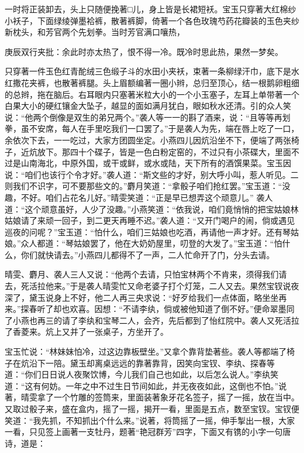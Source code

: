 \begin{parag}
    一时将正装卸去，头上只随便挽著□儿，身上皆是长裙短袄。宝玉只穿著大红棉纱小袄子，下面绿绫弹墨袷裤，散著裤脚，倚著一个各色玫瑰芍药花瓣装的玉色夹纱新枕头，和芳官两个先划拳。当时芳官满口嚷热，\begin{note}庚辰双行夹批：余此时亦太热了，恨不得一冷。既冷时思此热，果然一梦矣。\end{note}只穿著一件玉色红青酡绒三色缎子斗的水田小夹袄，束著一条柳绿汗巾，底下是水红撒花夹裤，也散著裤腿。头上眉额编著一圈小辫，总归至顶心，结一根鹅卵粗细的总辫，拖在脑后。右耳眼内只塞著米粒大小的一个小玉塞子，左耳上单带著一个白果大小的硬红镶金大坠子，越显的面如满月犹白，眼如秋水还清。引的众人笑说：“他两个倒像是双生的弟兄两个。”袭人等一一的斟了酒来，说：“且等等再划拳，虽不安席，每人在手里吃我们一口罢了。”于是袭人为先，端在唇上吃了一口，余依次下去，一一吃过，大家方团圆坐定。小燕四儿因炕沿坐不下，便端了两张椅子，近炕放下。那四十个碟子，皆是一色白粉定窑的，不过只有小茶碟大，里面不过是山南海北，中原外国，或干或鲜，或水或陆，天下所有的酒馔果菜。宝玉因说：“咱们也该行个令才好。”袭人道：“斯文些的才好，别大呼小叫，惹人听见。二则我们不识字，可不要那些文的。”麝月笑道：“拿骰子咱们抢红罢。”宝玉道：“没趣，不好。咱们占花名儿好。”晴雯笑道：“正是早已想弄这个顽意儿。” 袭人道：“这个顽意虽好，人少了没趣。”小燕笑道：“依我说，咱们竟悄悄的把宝姑娘林姑娘请了来顽一回子，到二更天再睡不迟。”袭人道：“又开门喝户的闹，倘或遇见巡夜的问呢？”宝玉道：“怕什么，咱们三姑娘也吃酒，再请他一声才好。还有琴姑娘。”众人都道：“琴姑娘罢了，他在大奶奶屋里，叨登的大发了。”宝玉道：“怕什么，你们就快请去。”小燕四儿都得不了一声，二人忙命开了门，分头去请。
\end{parag}


\begin{parag}
    晴雯、麝月、袭人三人又说：“他两个去请，只怕宝林两个不肯来，须得我们请去，死活拉他来。”于是袭人晴雯忙又命老婆子打个灯笼，二人又去。果然宝钗说夜深了，黛玉说身上不好，他二人再三央求说：“好歹给我们一点体面，略坐坐再来。”探春听了却也欢喜。因想：“不请李纨，倘或被他知道了倒不好。”便命翠墨同了小燕也再三的请了李纨和宝琴二人，会齐，先后都到了怡红院中。袭人又死活拉了香菱来。炕上又并了一张桌子，方坐开了。
\end{parag}


\begin{parag}
    宝玉忙说：“林妹妹怕冷，过这边靠板壁坐。”又拿个靠背垫著些。袭人等都端了椅子在炕沿下一陪。黛玉却离桌远远的靠著靠背，因笑向宝钗、李纨、探春等道：“你们日日说人夜聚饮博，今儿我们自己也如此，以后怎么说人。”李纨笑道：“这有何妨。一年之中不过生日节间如此，并无夜夜如此，这倒也不怕。”说著，晴雯拿了一个竹雕的签筒来，里面装著象牙花名签子，摇了一摇，放在当中。又取过骰子来，盛在盒内，摇了一摇，揭开一看，里面是五点，数至宝钗。宝钗便笑道：“我先抓，不知抓出个什么来。”说著，将筒摇了一摇，伸手掣出一根，大家一看，只见签上画著一支牡丹，题著“艳冠群芳”四字，下面又有镌的小字一句唐诗，道是：
\end{parag}


